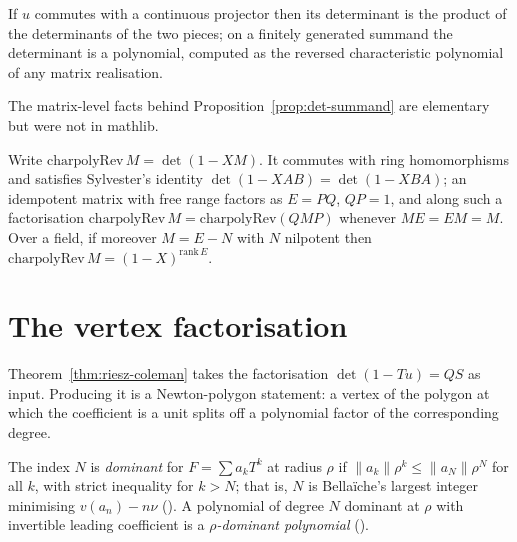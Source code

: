 \begin{proposition}
  \label{prop:det-summand}
  \leanok
  If $u$ commutes with a continuous projector then its determinant is the product of the
  determinants of the two pieces; on a finitely generated summand the determinant is a
  polynomial, computed as the reversed characteristic polynomial of any matrix realisation.
\end{proposition}

The matrix-level facts behind Proposition~\ref{prop:det-summand} are elementary but were not in
mathlib.

\begin{lemma}
  \label{lem:charpolyrev}
  \leanok
  Write $\mathrm{charpolyRev}\,M = \det(1 - XM)$.  It commutes with ring homomorphisms and
  satisfies Sylvester's identity $\det(1-XAB) = \det(1-XBA)$; an idempotent matrix with free
  range factors as $E = PQ$, $QP = 1$, and along such a factorisation
  $\mathrm{charpolyRev}\,M = \mathrm{charpolyRev}(QMP)$ whenever $ME = EM = M$.  Over a field,
  if moreover $M = E - N$ with $N$ nilpotent then
  $\mathrm{charpolyRev}\,M = (1-X)^{\mathrm{rank}\,E}$.
\end{lemma}

\section{The vertex factorisation}

Theorem~\ref{thm:riesz-coleman} takes the factorisation $\det(1-Tu) = QS$ as input.  Producing
it is a Newton-polygon statement: a vertex of the polygon at which the coefficient is a unit
splits off a polynomial factor of the corresponding degree.

\begin{definition}
  \label{def:dominant-index}
  \leanok
  The index $N$ is \emph{dominant} for $F = \sum a_k T^k$ at radius $\rho$ if
  $\lVert a_k\rVert\rho^k \leq \lVert a_N\rVert\rho^N$ for all $k$, with strict inequality for
  $k > N$; that is, $N$ is Bella\"iche's largest integer minimising $v(a_n) - n\nu$
  (\cite[Definition II.2.3]{Bellaiche}).  A polynomial of degree $N$ dominant at $\rho$ with
  invertible leading coefficient is a \emph{$\rho$-dominant polynomial}
  (\cite[Definition II.2.4]{Bellaiche}).
\end{definition}

